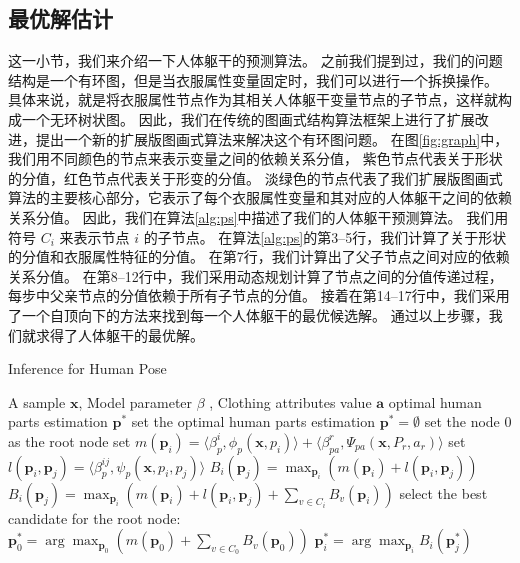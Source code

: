 \subsection{最优解估计}
这一小节，我们来介绍一下人体躯干的预测算法。
之前我们提到过，我们的问题结构是一个有环图，但是当衣服属性变量固定时，我们可以进行一个拆换操作。
具体来说，就是将衣服属性节点作为其相关人体躯干变量节点的子节点，这样就构成一个无环树状图。
因此，我们在传统的图画式结构算法框架上进行了扩展改进，提出一个新的扩展版图画式算法来解决这个有环图问题。
在图\ref{fig:graph}中，我们用不同颜色的节点来表示变量之间的依赖关系分值，
紫色节点代表关于形状的分值，红色节点代表关于形变的分值。
淡绿色的节点代表了我们扩展版图画式算法的主要核心部分，它表示了每个衣服属性变量和其对应的人体躯干之间的依赖关系分值。
因此，我们在算法\ref{alg:ps}中描述了我们的人体躯干预测算法。
我们用符号 $C_i$ 来表示节点 $i$ 的子节点。
在算法\ref{alg:ps}的第3--5行，我们计算了关于形状的分值和衣服属性特征的分值。
在第7行，我们计算出了父子节点之间对应的依赖关系分值。
在第8--12行中，我们采用动态规划计算了节点之间的分值传递过程，每步中父亲节点的分值依赖于所有子节点的分值。
接着在第14--17行中，我们采用了一个自顶向下的方法来找到每一个人体躯干的最优候选解。
通过以上步骤，我们就求得了人体躯干的最优解。

\begin{algorithm}
\caption{Inference for Human Pose}
\begin{algorithmic}[1]
    \REQUIRE A sample $\mathbf{x}$, Model parameter $\beta$ ,  Clothing attributes value $\mathbf{a}$
    \ENSURE optimal human parts estimation $\mathbf{p^*}$
    \STATE set the optimal human parts estimation $\mathbf{p^*} = \emptyset$
    \STATE set the node 0 as the root node
        \STATE set $m(\mathbf{p}_i) = \langle \beta_p^i, \phi_p(\mathbf{x}, p_i) \rangle + \langle \beta_{pa}^r, \Psi_{pa}(\mathbf{x}, P_r, a_r) \rangle$
    \ENDFOR
        \STATE set $l(\mathbf{p}_i, \mathbf{p}_j) = \langle \beta_p^{ij}, \psi_p(\mathbf{x}, p_i, p_j) \rangle$
            \STATE $B_i(\mathbf{p}_j) = \max_{\mathbf{p}_i} (m(\mathbf{p}_i) + l(\mathbf{p}_i, \mathbf{p}_j) )$
        \ELSE
            \STATE $B_i(\mathbf{p}_j) = \max_{\mathbf{p}_i} (m(\mathbf{p}_i) + l(\mathbf{p}_i, \mathbf{p}_j) + \sum_{v \in C_i} B_v(\mathbf{p}_i) )$
        \ENDIF
    \ENDFOR
    \STATE select the best candidate for the root node: \\
        $\mathbf{p}_0^* = \arg \max_{\mathbf{p}_0} ( m(\mathbf{p}_0) + \sum_{v \in C_0} B_v(\mathbf{p}_0) )$
        \STATE $\mathbf{p}_i^* = \arg \max_{\mathbf{p}_i} B_i(\mathbf{p}_j^*)$
    \ENDFOR
\end{algorithmic}
\label{alg:ps}
\end{algorithm}
